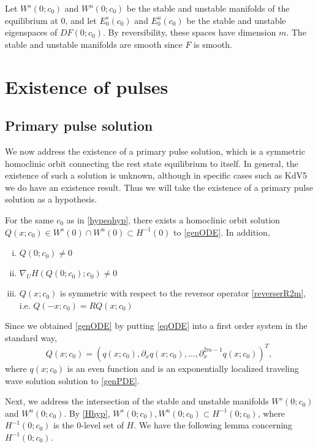 \documentclass[thesis.tex]{subfiles}
\begin{document}
Let $W^s(0; c_0)$ and $W^u(0; c_0)$ be the stable and unstable manifolds of the equilibrium at 0, and let $E_0^s(c_0)$ and $E_0^u(c_0)$ be the stable and unstable eigenspaces of $DF(0; c_0)$. By reversibility, these spaces have dimension $m$. The stable and unstable manifolds are smooth since $F$ is smooth.

\section{Existence of pulses}

\subsection{Primary pulse solution}\label{sec:primarypulse}

We now address the existence of a primary pulse solution, which is a symmetric homoclinic orbit connecting the rest state equilibrium to itself. In general, the existence of such a solution is unknown, although in specific cases such as KdV5 we do have an existence result. Thus we will take the existence of a primary pulse solution as a hypothesis.

\begin{hypothesis}\label{Qexistshyp}
For the same $c_0$ as in \cref{hypeqhyp}, there exists a homoclinic orbit solution $Q(x; c_0) \in W^s(0) \cap W^u(0) \subset H^{-1}(0)$ to \cref{genODE}. In addition,
\begin{enumerate}[(i)]
\item $Q(0; c_0) \neq 0$
\item $\nabla_U H(Q(0; c_0); c_0) \neq 0$
\item $Q(x; c_0)$ is symmetric with respect to the reversor operator \cref{reverserR2m}, i.e. $Q(-x; c_0) = R Q(x; c_0)$
\end{enumerate}
\end{hypothesis}

\noi Since we obtained \cref{genODE} by putting \cref{eqODE} into a first order system in the standard way, 
\begin{equation}\label{Qqrelation}
Q(x; c_0) = (q(x; c_0), \partial_x q(x; c_0), \dots, \partial_x^{2m-1}q(x; c_0))^T,
\end{equation}
where $q(x; c_0)$ is an even function and is an exponentially localized traveling wave solution solution to \cref{genPDE}. 

Next, we address the intersection of the stable and unstable manifolds $W^s(0; c_0)$ and $W^u(0; c_0)$. By \cref{Hhyp}, $W^s(0; c_0), W^u(0; c_0) \subset H^{-1}(0; c_0)$, where $H^{-1}(0; c_0)$ is the 0-level set of $H$. We have the following lemma concerning $H^{-1}(0; c_0)$.
\end{document}
